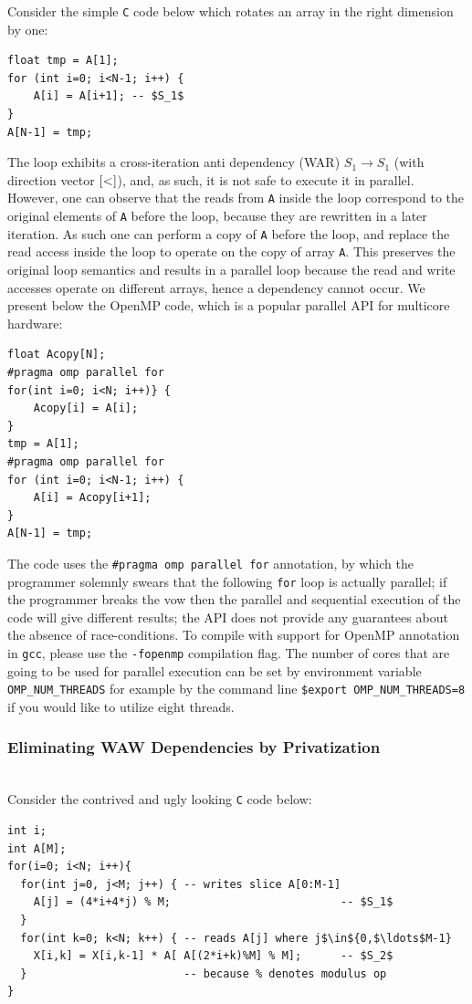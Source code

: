 \documentclass[acmsmall,review]{acmart}\settopmatter{printfolios=true,printccs=false,printacmref=false}
\begin{document}
Consider the simple {\tt C} code below which rotates an array in
the right dimension by one:
\begin{lstlisting}[mathescape=true]
float tmp = A[1];
for (int i=0; i<N-1; i++) {
    A[i] = A[i+1]; -- $S_1$   
}
A[N-1] = tmp;
\end{lstlisting}\vspace{-2ex}
The loop exhibits a cross-iteration anti dependency (WAR)
$S_1\to S_1$ (with direction vector ${\tt[<]}$), and, as 
such, it is not safe to execute it in parallel. However, 
one can observe that the reads from {\tt A} inside the loop
correspond to the original elements of {\tt A} before
the loop, because they are rewritten in a later iteration.
As such one can perform a copy of {\tt A} before the loop, 
and replace the read access inside the loop to operate on 
the copy of array {\tt A}. This preserves the original 
loop semantics and results in a parallel loop because
the read and write accesses operate on different arrays,
hence a dependency cannot occur. We present below the
OpenMP code, which is a popular parallel API for multicore 
hardware:
\begin{lstlisting}[mathescape=true]
float Acopy[N];
#pragma omp parallel for
for(int i=0; i<N; i++)} {
    Acopy[i] = A[i];
}
tmp = A[1];
#pragma omp parallel for
for (int i=0; i<N-1; i++) {
    A[i] = Acopy[i+1];
}
A[N-1] = tmp;
\end{lstlisting}\vspace{-2ex}
The code uses the {\tt\#pragma omp parallel for} annotation,
by which the programmer solemnly swears that the following
\lstinline{for} loop is actually parallel; if the programmer
breaks the vow then the parallel and sequential execution of
the code will give different results; the API does not provide
any guarantees about the absence of race-conditions. 
To compile with support for OpenMP annotation in {\tt gcc},
please use the {\tt-fopenmp} compilation flag. The number
of cores that are going to be used for parallel execution
can be set by environment variable {\tt OMP\_NUM\_THREADS}
for example by the command line {\tt\$export OMP\_NUM\_THREADS=8}
if you would like to utilize eight threads.

\newpage
\subsubsection{Eliminating WAW Dependencies by Privatization}
$\mbox{ }$\\

Consider the contrived and ugly looking {\tt C} code below:
\begin{lstlisting}[mathescape=true]
int i;
int A[M];
for(i=0; i<N; i++){
  for(int j=0, j<M; j++) { -- writes slice A[0:M-1]
    A[j] = (4*i+4*j) % M;                          -- $S_1$
  } 
  for(int k=0; k<N; k++) { -- reads A[j] where j$\in${0,$\ldots$M-1}
    X[i,k] = X[i,k-1] * A[ A[(2*i+k)%M] % M];      -- $S_2$
  }                        -- because % denotes modulus op 
}
\end{lstlisting}\vspace{-2ex}
\end{document}
